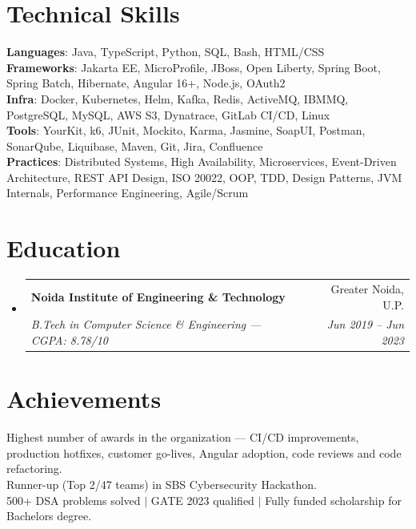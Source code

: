 \documentclass[letterpaper,11pt]{article}
\makeatletter
\newcommand{\resumeSubheading}[4]{
  \vspace{-2pt}\item
    \begin{tabular*}{0.97\textwidth}[t]{l@{\extracolsep{\fill}}r}
      \textbf{#1} & #2 \\
      \textit{\small#3} & \textit{\small #4} \\
    \end{tabular*}\vspace{-7pt}
}
\newcommand{\resumeSubHeadingListStart}{\begin{itemize}[leftmargin=0.15in, label={}]}
\newcommand{\resumeSubHeadingListEnd}{\end{itemize}}
\makeatother
\begin{document}
\section{Technical Skills}
 \begin{itemize}[leftmargin=0.15in, label={}]
    \small{\item{
     \textbf{Languages}{: Java, TypeScript, Python, SQL, Bash, HTML/CSS} \\
     \textbf{Frameworks}{: Jakarta EE, MicroProfile, JBoss, Open Liberty, Spring Boot, Spring Batch, Hibernate, Angular 16+, Node.js, OAuth2} \\
     \textbf{Infra}{: Docker, Kubernetes, Helm, Kafka, Redis, ActiveMQ, IBMMQ, PostgreSQL, MySQL, AWS S3, Dynatrace, GitLab CI/CD, Linux} \\
     \textbf{Tools}{: YourKit, k6, JUnit, Mockito, Karma, Jasmine, SoapUI, Postman, SonarQube, Liquibase, Maven, Git, Jira, Confluence} \\
     \textbf{Practices}{: Distributed Systems, High Availability, Microservices, Event-Driven Architecture, REST API Design, ISO 20022, OOP, TDD, Design Patterns, JVM Internals, Performance Engineering, Agile/Scrum}
    }}
 \end{itemize}

\section{Education}
  \resumeSubHeadingListStart
    \resumeSubheading
      {Noida Institute of Engineering \& Technology}{Greater Noida, U.P.}
      {B.Tech in Computer Science \& Engineering --- CGPA: 8.78/10}{Jun 2019 -- Jun 2023}
  \resumeSubHeadingListEnd

\section{Achievements}
 \begin{itemize}[leftmargin=0.15in, label={}]
    \small{\item{
     {Highest number of awards in the organization --- CI/CD improvements, production hotfixes, customer go-lives, Angular adoption, code reviews and code refactoring.} \\
     {Runner-up (Top 2/47 teams) in SBS Cybersecurity Hackathon.} \\
     {500+ DSA problems solved $|$ GATE 2023 qualified $|$ Fully funded scholarship for Bachelors degree.}
    }}
 \end{itemize}

\end{document}

